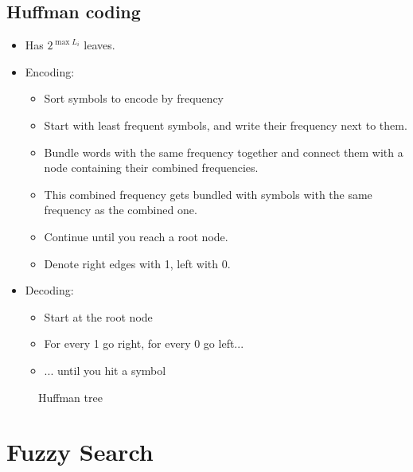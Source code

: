 \documentclass[a4paper]{scrartcl}
\begin{document}
\subsection{Huffman coding}
\label{sec:huffman_coding}
\begin{itemize}
\item Has $2^{\max L_i}$ leaves.
\item Encoding:
  \begin{itemize}
  \item Sort symbols to encode by frequency
  \item Start with least frequent symbols, and write their frequency next to
    them.
  \item Bundle words with the same frequency together and connect them with a
    node containing their combined frequencies.
  \item This combined frequency gets bundled with symbols with the same
    frequency as the combined one.
  \item Continue until you reach a root node.
  \item Denote right edges with 1, left with 0.
  \end{itemize}
\item Decoding:
  \begin{itemize}
  \item Start at the root node
  \item For every 1 go right, for every 0 go left...
  \item ... until you hit a symbol
  \end{itemize}
\end{itemize}
\begin{figure}[!htbp]
  \centering
  
  \caption{Huffman tree}
  \label{fig:huffman_tree}
\end{figure}

\section{Fuzzy Search}
\label{sec:fuzzy_search}
\end{document}
